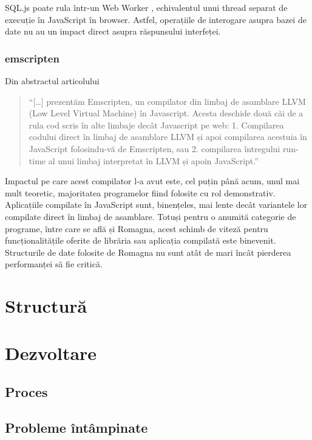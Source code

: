 \documentclass[12pt, a4paper, twoside, romanian]{teza-upb}
\begin{document}
      SQL.js poate rula într-un Web Worker \cite{Hickson:12:WW}, echivalentul unui thread separat de execuție în JavaScript în browser. Astfel, operațiile de interogare asupra bazei de date nu au un impact direct asupra răspunsului interfeței.

      \subsubsection{emscripten}
      \label{subsec:emscripten}
        Din abstractul articolului \cite{Zakai:2011:ELC:2048147.2048224}
        \begin{quote}
          ``[\ldots] prezentăm Emscripten, un compilator din limbaj de asamblare LLVM (Low Level Virtual Machine) în Javascript. Acesta deschide două căi de a rula cod scris în alte limbaje decât Javascript pe web: 1. Compilarea codului direct în limbaj de asamblare LLVM și apoi compilarea acestuia în JavaScript folosindu-vă de Emscripten, sau 2. compilarea întregului run-time al unui limbaj interpretat în LLVM și apoin JavaScript.''
        \end{quote}

      Impactul pe care acest compilator l-a avut este, cel puțin până acum, unul mai mult teoretic, majoritatea programelor fiind folosite cu rol demonstrativ. Aplicațiile compilate în JavaScript sunt, binențeles, mai lente decât variantele lor compilate direct în limbaj de asamblare. Totuși pentru o anumită categorie de programe, între care se află și Romagna, acest schimb de viteză pentru funcționalitățile oferite de librăria sau aplicația compilată este binevenit. Structurile de date folosite de Romagna nu sunt atât de mari încât pierderea performanței să fie critică.

  \section{Structură}
  \section{Dezvoltare}

    \subsection{Proces}

    \subsection{Probleme întâmpinate}
\end{document}

